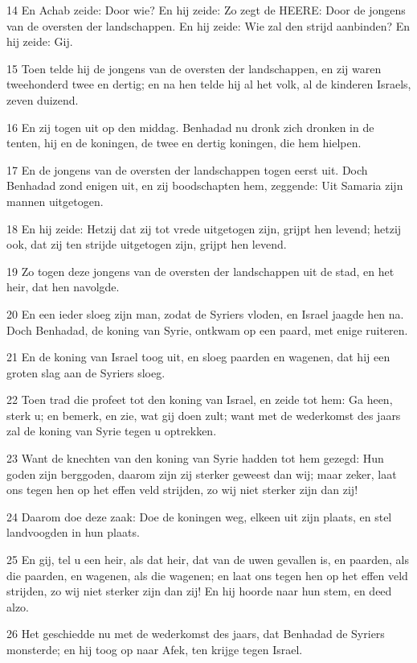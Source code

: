 \par 14 En Achab zeide: Door wie? En hij zeide: Zo zegt de HEERE: Door de jongens van de oversten der landschappen. En hij zeide: Wie zal den strijd aanbinden? En hij zeide: Gij.
\par 15 Toen telde hij de jongens van de oversten der landschappen, en zij waren tweehonderd twee en dertig; en na hen telde hij al het volk, al de kinderen Israels, zeven duizend.
\par 16 En zij togen uit op den middag. Benhadad nu dronk zich dronken in de tenten, hij en de koningen, de twee en dertig koningen, die hem hielpen.
\par 17 En de jongens van de oversten der landschappen togen eerst uit. Doch Benhadad zond enigen uit, en zij boodschapten hem, zeggende: Uit Samaria zijn mannen uitgetogen.
\par 18 En hij zeide: Hetzij dat zij tot vrede uitgetogen zijn, grijpt hen levend; hetzij ook, dat zij ten strijde uitgetogen zijn, grijpt hen levend.
\par 19 Zo togen deze jongens van de oversten der landschappen uit de stad, en het heir, dat hen navolgde.
\par 20 En een ieder sloeg zijn man, zodat de Syriers vloden, en Israel jaagde hen na. Doch Benhadad, de koning van Syrie, ontkwam op een paard, met enige ruiteren.
\par 21 En de koning van Israel toog uit, en sloeg paarden en wagenen, dat hij een groten slag aan de Syriers sloeg.
\par 22 Toen trad die profeet tot den koning van Israel, en zeide tot hem: Ga heen, sterk u; en bemerk, en zie, wat gij doen zult; want met de wederkomst des jaars zal de koning van Syrie tegen u optrekken.
\par 23 Want de knechten van den koning van Syrie hadden tot hem gezegd: Hun goden zijn berggoden, daarom zijn zij sterker geweest dan wij; maar zeker, laat ons tegen hen op het effen veld strijden, zo wij niet sterker zijn dan zij!
\par 24 Daarom doe deze zaak: Doe de koningen weg, elkeen uit zijn plaats, en stel landvoogden in hun plaats.
\par 25 En gij, tel u een heir, als dat heir, dat van de uwen gevallen is, en paarden, als die paarden, en wagenen, als die wagenen; en laat ons tegen hen op het effen veld strijden, zo wij niet sterker zijn dan zij! En hij hoorde naar hun stem, en deed alzo.
\par 26 Het geschiedde nu met de wederkomst des jaars, dat Benhadad de Syriers monsterde; en hij toog op naar Afek, ten krijge tegen Israel.
